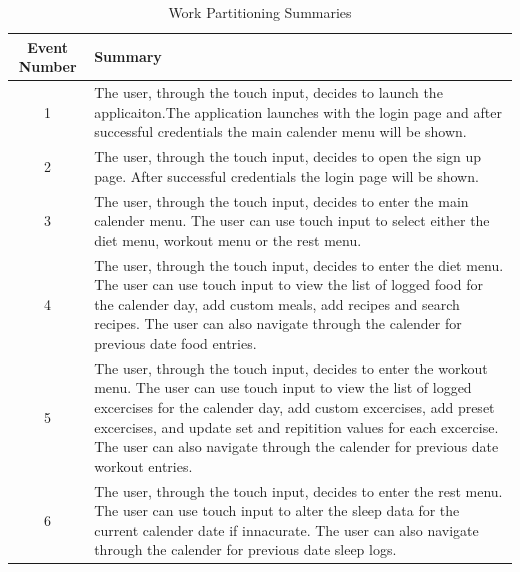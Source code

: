 \documentclass[12pt,letterpaper]{article}
\begin{document}
\begin{table}[h]
\caption{Work Partitioning Summaries}
\centering
\begin{tabular}{|c|p{10cm}|}
\hline
\textbf{Event Number} & \textbf{Summary} \\
\hline
1 & The user, through the touch input, decides to launch the applicaiton.The application launches with the login page and after successful credentials the main calender menu will be shown. \\
\hline
2 & The user, through the touch input, decides to open the sign up page. After successful credentials the login page will be shown. \\
\hline
3 & The user, through the touch input, decides to enter the main calender menu. The user can use touch input to select either the diet menu, workout menu or the rest menu. \\
\hline
4 & The user, through the touch input, decides to enter the diet menu. The user can use touch input to view the list of logged food for the calender day, add custom meals, add recipes and search recipes. The user can also navigate through the calender for previous date food entries. \\
\hline
5 & The user, through the touch input, decides to enter the workout menu. The user can use touch input to view the list of logged excercises for the calender day, add custom excercises, add preset excercises, and update set and repitition values for each excercise. The user can also navigate through the calender for previous date workout entries. \\
\hline
6 & The user, through the touch input, decides to enter the rest menu. The user can use touch input to alter the sleep data for the current calender date if innacurate. The user can also navigate through the calender for previous date sleep logs. \\
\hline
\end{tabular}
\end{table}
\end{document}
